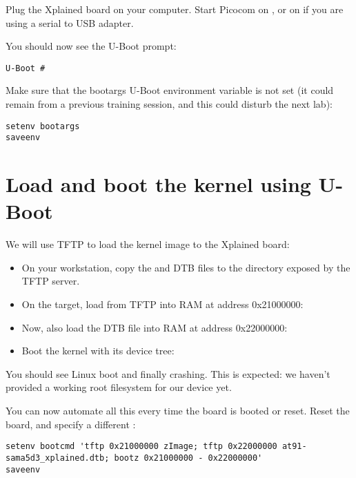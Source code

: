 Plug the Xplained board on your computer. Start Picocom on
, or on  if you are using a serial
to USB adapter.

You should now see the U-Boot prompt:

\begin{verbatim}
U-Boot #
\end{verbatim}

Make sure that the bootargs U-Boot environment variable is not set (it
could remain from a previous training session, and this could disturb
the next lab):

\begin{verbatim}
setenv bootargs
saveenv
\end{verbatim}

\section{Load and boot the kernel using U-Boot}

We will use TFTP to load the kernel image to the Xplained board:

\begin{itemize}

\item On your workstation, copy the  and DTB files to the
  directory exposed by the TFTP server.

\item On the target, load  from TFTP into RAM at address
  0x21000000:\\

\item Now, also load the DTB file into RAM at address 0x22000000:\\

\item Boot the kernel with its device tree:\\

\end{itemize}

You should see Linux boot and finally crashing. This is expected: we
haven't provided a working root filesystem for our device yet.

You can now automate all this every time the board is booted or
reset. Reset the board, and specify a different :

{\scriptsize
\begin{verbatim}
setenv bootcmd 'tftp 0x21000000 zImage; tftp 0x22000000 at91-sama5d3_xplained.dtb; bootz 0x21000000 - 0x22000000'
saveenv
\end{verbatim}
}

